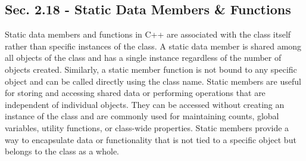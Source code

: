 \subsection*{Sec. 2.18 - Static Data Members \& Functions}

Static data members and functions in C++ are associated with the class itself rather than specific instances of the class. A static data member is shared among all objects of the class and has a single instance regardless of the number of objects created. Similarly, a static member function is not bound to any specific object 
and can be called directly using the class name. Static members are useful for storing and accessing shared data or performing operations that are independent of individual objects. They can be accessed without creating an instance of the class and are commonly used for maintaining counts, global variables, utility functions, 
or class-wide properties. Static members provide a way to encapsulate data or functionality that is not tied to a specific object but belongs to the class as a whole.


